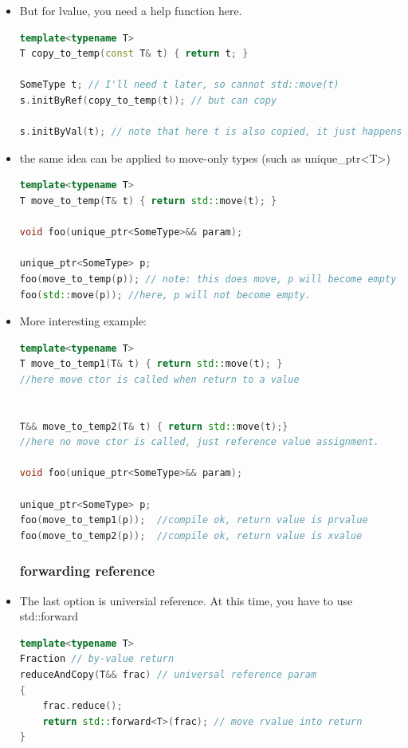 \documentclass[a4paper,12pt,twoside]{book}
\begin{document}
\begin{itemize}
\item But for lvalue, you need a help function here.
\begin{lstlisting}[frame=single, language=c++]
template<typename T>
T copy_to_temp(const T& t) { return t; }

SomeType t; // I'll need t later, so cannot std::move(t)
s.initByRef(copy_to_temp(t)); // but can copy

s.initByVal(t); // note that here t is also copied, it just happens implicitly
\end{lstlisting}

\item the same idea can be applied to move-only types (such as unique\_ptr<T>)
\begin{lstlisting}[frame=single, language=c++]
template<typename T>
T move_to_temp(T& t) { return std::move(t); }

void foo(unique_ptr<SomeType>&& param);

unique_ptr<SomeType> p;
foo(move_to_temp(p)); // note: this does move, p will become empty
foo(std::move(p)); //here, p will not become empty. 
\end{lstlisting}


\item More interesting example:
\begin{lstlisting}[frame=single, language=c++]
template<typename T>
T move_to_temp1(T& t) { return std::move(t); }
//here move ctor is called when return to a value


T&& move_to_temp2(T& t) { return std::move(t);}
//here no move ctor is called, just reference value assignment.

void foo(unique_ptr<SomeType>&& param);

unique_ptr<SomeType> p;
foo(move_to_temp1(p));  //compile ok, return value is prvalue
foo(move_to_temp2(p));  //compile ok, return value is xvalue
\end{lstlisting}


\subsubsection{forwarding reference}

\item The last option is universial reference. At this time, you have to use std::forward 
\begin{lstlisting}[frame=single, language=c++]
template<typename T>
Fraction // by-value return
reduceAndCopy(T&& frac) // universal reference param
{
	frac.reduce();
	return std::forward<T>(frac); // move rvalue into return
} 
\end{lstlisting}

\end{itemize}
\end{document}
